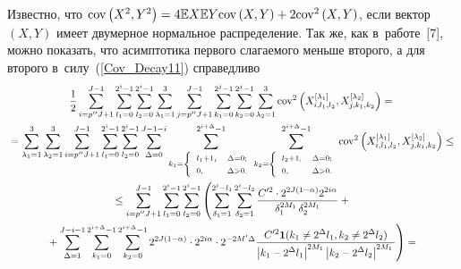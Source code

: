 Известно, что $\cov\left(X^2,Y^2\right) \hm= 4\Expect X\Expect Y \cov\left(X, Y\right) + 2
\cov^2 \left(X, Y\right)$, если вектор $(X,Y)$ имеет двумерное нормальное распределение.
Так же, как в~работе~[7], можно показать, что асимптотика первого
слагаемого меньше второго, а для второго в~силу~(\ref{Cov_Decay11}) справедливо
\begin{multline*}
\fr{1}{2} \sum\limits_{i = p''J + 1}^{J - 1}
\sum\limits_{l_1 = 0}^{2^i - 1} \sum\limits_{l_2 = 0}^{2^i - 1}
\sum\limits_{\lambda_1=1}^3 \sum\limits_{j = p''J + 1}^{J - 1}
\sum\limits_{k_1 = 0}^{2^j - 1} \sum\limits_{k_2 = 0}^{2^j - 1}
\sum\limits_{\lambda_2=1}^3
\cov^2\left(X_{i,l_1,l_2}^{[\lambda_1]}, X_{j,k_1,k_2}^{[\lambda_2]}\right)=
{}\\
{}=\sum\limits_{\lambda_1=1}^3\sum\limits_{\lambda_2=1}^3
\sum\limits_{i = p''J + 1}^{J - 1} \sum\limits_{l_1 = 0}^{2^i - 1}
\sum\limits_{l_2 = 0}^{2^i - 1} \sum\limits_{\Delta = 0}^{J - 1 - i}
{\sum\limits^{2^{i+\Delta} - 1}_{k_1 = %
\left\{
\begin{array}{ll} %
{\scriptstyle l_1 + 1}, & {\scriptstyle \Delta = 0;} \\
{\scriptstyle 0,} & {\scriptstyle \Delta > 0.}
\end{array}\right.
}}
{\sum\limits^{2^{i+\Delta} - 1}_{k_2 =  %
\left\{  %
\begin{array}{ll}
{\scriptstyle l_2 + 1,} & {\scriptstyle \Delta = 0;} \\
{\scriptstyle 0,} & {\scriptstyle \Delta > 0.}
\end{array}
\right.
} }
\cov^2\left(X_{i,l_1,l_2}^{[\lambda_1]},
X_{j,k_1,k_2}^{[\lambda_2]}\right) \leq{}\\
{}\leq \sum\limits_{i = p''J + 1}^{J - 1} \sum\limits_{l_1 = 0}^{2^i - 1}
\sum\limits_{l_2 = 0}^{2^i - 1}
\left(\sum\limits_{\delta_1 = 1}^{2^i - l_1} \sum\limits_{\delta_2 = 1}^{2^i - l_2}
\fr{ C'^2 \cdot2^{2J(1-\alpha)}2^{2i\alpha}}{\delta_1^{2M_1}\, \delta_2^{2M_1}} +{}
\right.\\
\left.{}+ \sum\limits_{\Delta = 1}^{J-i-1}\sum\limits_{k_1 = 0}^{2^{i+\Delta} - 1}
\sum\limits_{k_2 = 0}^{2^{i+\Delta} - 1}
2^{2J(1-\alpha)}\cdot 2^{2i\alpha}\cdot 2^{-2M'\Delta}
\fr{C'^2\mathbf{1}(k_1 \neq 2^{\Delta} l_1,k_2 \neq 2^{\Delta} l_2)}
{\left\vert k_1 - 2^{\Delta} l_1\right\vert^{2M_1}\left\vert k_2 - 2^{\Delta} l_2\right\vert^{2M_1}} \right) ={}
\end{multline*}

